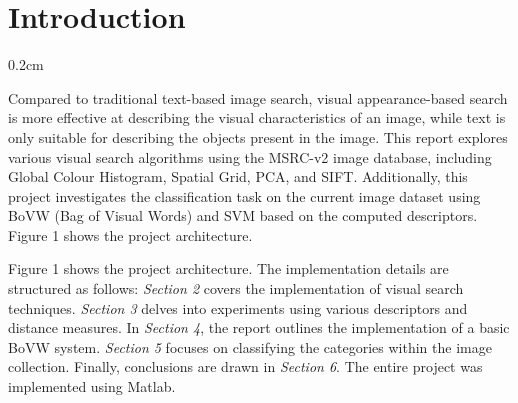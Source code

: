 \documentclass{article}
\newcommand{\setParDis}{\setlength {\parskip} {0.2cm} } %
\begin{document}

\section{Introduction}
\setParDis

Compared to traditional text-based image search, visual appearance-based search is more effective at describing the visual characteristics of an image, while text is only suitable for describing the objects present in the image. This report explores various visual search algorithms using the MSRC-v2 image database, including Global Colour Histogram, Spatial Grid, PCA, and SIFT. Additionally, this project investigates the classification task on the current image dataset using BoVW (Bag of Visual Words) and SVM based on the computed descriptors. Figure 1 shows the project architecture.

Figure 1 shows the project architecture. The implementation details are structured as follows: \textit{Section 2} covers the implementation of visual search techniques. \textit{Section 3} delves into experiments using various descriptors and distance measures. In \textit{Section 4}, the report outlines the implementation of a basic BoVW system. \textit{Section 5} focuses on classifying the categories within the image collection. Finally, conclusions are drawn in \textit{Section 6}. The entire project was implemented using Matlab.




\end{document}
